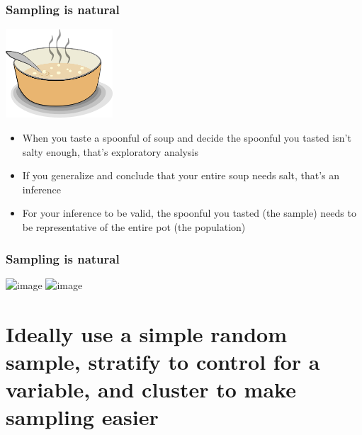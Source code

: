 \documentclass[11pt]{beamer}
\begin{document}
\begin{frame}
\frametitle{Sampling is natural}

\begin{center}
\includegraphics[width=0.3\textwidth]{figures/soup}
\end{center}

\begin{itemize}

\item When you taste a spoonful of soup and decide the spoonful you tasted isn't salty 
enough, that's \alert{exploratory analysis}

\item If you generalize and conclude that your entire soup needs salt, that's an \alert{
inference}

\item For your inference to be valid, the spoonful you tasted (the sample) needs to be 
\alert{representative} of the entire pot (the population)

\end{itemize}
\end{frame}


\begin{frame}
\frametitle{Sampling is natural}
\begin{center}
\includegraphics<1>[width=0.5\textwidth]{figures/tacobowl.jpg}
\includegraphics<2>[width=1\textwidth]{figures/tacobowl_close.jpg}
\end{center}
\end{frame}

\section{Ideally use a simple random sample, stratify to control for a variable, and cluster to make sampling easier} 
\label{mi2}
\end{document}
